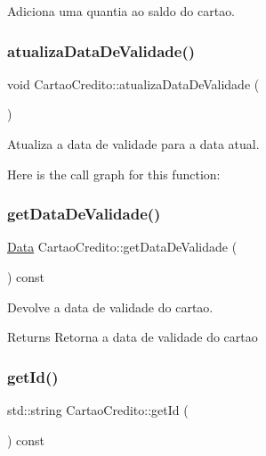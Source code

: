 Adiciona uma quantia ao saldo do cartao. 

\mbox{\label{class_cartao_credito_a52daaab859e37d416c00044ef0fb2f27}} 
\subsubsection{\texorpdfstring{atualiza\+Data\+De\+Validade()}{atualizaDataDeValidade()}}
{\footnotesize\ttfamily void Cartao\+Credito\+::atualiza\+Data\+De\+Validade (\begin{DoxyParamCaption}{ }\end{DoxyParamCaption})}



Atualiza a data de validade para a data atual. 

Here is the call graph for this function\+:
\mbox{\label{class_cartao_credito_ab28b73bbecc20b5c23348e1172230533}} 
\subsubsection{\texorpdfstring{get\+Data\+De\+Validade()}{getDataDeValidade()}}
{\footnotesize\ttfamily \mbox{\hyperlink{class_data}{Data}} Cartao\+Credito\+::get\+Data\+De\+Validade (\begin{DoxyParamCaption}{ }\end{DoxyParamCaption}) const}



Devolve a data de validade do cartao. 

\begin{DoxyReturn}{Returns}
Retorna a data de validade do cartao 
\end{DoxyReturn}
\mbox{\label{class_cartao_credito_ab59d60e4d155e7f29aef888ea3139ee5}} 
\subsubsection{\texorpdfstring{get\+Id()}{getId()}}
{\footnotesize\ttfamily std\+::string Cartao\+Credito\+::get\+Id (\begin{DoxyParamCaption}{ }\end{DoxyParamCaption}) const}



